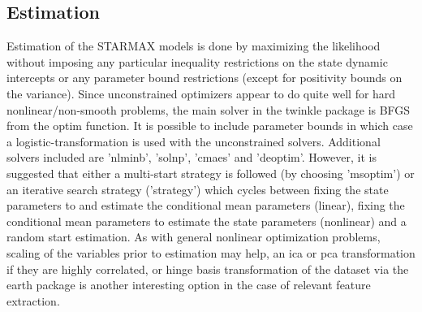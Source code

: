 \subsection{Estimation}
Estimation of the STARMAX models is done by maximizing the likelihood without
imposing any particular inequality restrictions on the state dynamic intercepts
or any parameter bound restrictions (except for positivity bounds on the
variance).
Since unconstrained optimizers appear to do quite well for hard nonlinear/non-smooth problems, the main solver in the twinkle 
package is BFGS from the optim function. It is possible to include parameter
bounds in which case a logistic-transformation is used with the unconstrained solvers.
Additional solvers included are 'nlminb', 'solnp', 'cmaes' and 'deoptim'.
However, it is suggested that either a multi-start strategy is followed
(by choosing 'msoptim') or an iterative search strategy ('strategy') which
cycles between fixing the state parameters to and estimate the conditional mean 
parameters (linear), fixing the conditional mean parameters to estimate the
state parameters (nonlinear) and a random start estimation. As with general
nonlinear optimization problems, scaling of the variables prior to estimation
may help, an ica or pca transformation if they are highly correlated, or hinge
basis transformation of the dataset via the earth package is another interesting
option in the case of relevant feature extraction.
